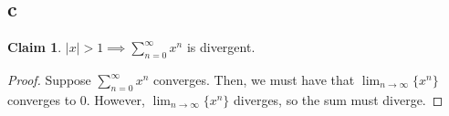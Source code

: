 \documentclass[12pt,letterpaper]{article}
\theoremstyle{definition}
\newtheorem*{claim}{Claim}
\begin{document}
\subsection*{c}

\begin{claim}
  $|x| > 1 \implies \sum_{n=0}^\infty x^n$ is divergent.
\end{claim}

\begin{proof}
  Suppose $\sum_{n=0}^\infty x^n$ converges. Then, we must have that
  $\lim_{n\rightarrow \infty} \{x^n\}$ converges to 0. However,
  $\lim_{n\rightarrow \infty} \{x^n\}$ diverges, so the sum must diverge.
\end{proof}
\end{document}
